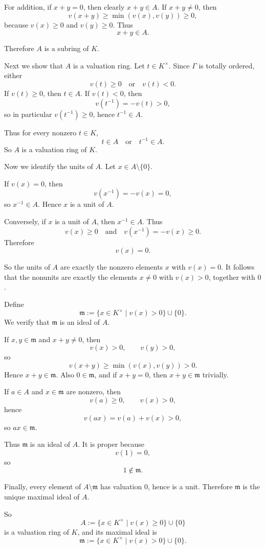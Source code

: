\documentclass[12pt,a4paper,oneside]{report}
\theoremstyle{notespace}
\begin{document}
For addition, if \(x+y=0\), then clearly \(x+y\in A\). If \(x+y\neq 0\), then
\[
v(x+y)\ge \min(v(x),v(y))\ge 0,
\]
because \(v(x)\ge 0\) and \(v(y)\ge 0\). Thus
\[
x+y\in A.
\]

Therefore \(A\) is a subring of \(K\).

\medskip

Next we show that \(A\) is a valuation ring. Let \(t\in K^\times\). Since \(\Gamma\) is totally ordered, either
\[
v(t)\ge 0
\quad\text{or}\quad
v(t)<0.
\]
If \(v(t)\ge 0\), then \(t\in A\). If \(v(t)<0\), then
\[
v(t^{-1})=-v(t)>0,
\]
so in particular \(v(t^{-1})\ge 0\), hence \(t^{-1}\in A\).

Thus for every nonzero \(t\in K\),
\[
t\in A \quad\text{or}\quad t^{-1}\in A.
\]
So \(A\) is a valuation ring of \(K\).

\medskip

Now we identify the units of \(A\). Let \(x\in A\setminus\{0\}\).

If \(v(x)=0\), then
\[
v(x^{-1})=-v(x)=0,
\]
so \(x^{-1}\in A\). Hence \(x\) is a unit of \(A\).

Conversely, if \(x\) is a unit of \(A\), then \(x^{-1}\in A\). Thus
\[
v(x)\ge 0
\quad\text{and}\quad
v(x^{-1})=-v(x)\ge 0.
\]
Therefore
\[
v(x)=0.
\]

So the units of \(A\) are exactly the nonzero elements \(x\) with \(v(x)=0\). It follows that the nonunits are exactly the elements \(x\neq 0\) with \(v(x)>0\), together with \(0\).

Define
\[
\mathfrak m:=\{x\in K^\times\mid v(x)>0\}\cup\{0\}.
\]
We verify that \(\mathfrak m\) is an ideal of \(A\).

If \(x,y\in \mathfrak m\) and \(x+y\neq 0\), then
\[
v(x)>0,\qquad v(y)>0,
\]
so
\[
v(x+y)\ge \min(v(x),v(y))>0.
\]
Hence \(x+y\in \mathfrak m\). Also \(0\in \mathfrak m\), and if \(x+y=0\), then \(x+y\in \mathfrak m\) trivially.

If \(a\in A\) and \(x\in \mathfrak m\) are nonzero, then
\[
v(a)\ge 0,\qquad v(x)>0,
\]
hence
\[
v(ax)=v(a)+v(x)>0,
\]
so \(ax\in \mathfrak m\).

Thus \(\mathfrak m\) is an ideal of \(A\). It is proper because
\[
v(1)=0,
\]
so
\[
1\notin \mathfrak m.
\]

Finally, every element of \(A\setminus \mathfrak m\) has valuation \(0\), hence is a unit. Therefore \(\mathfrak m\) is the unique maximal ideal of \(A\).

So
\[
A:=\{x\in K^\times\mid v(x)\ge 0\}\cup\{0\}
\]
is a valuation ring of \(K\), and its maximal ideal is
\[
\mathfrak m:=\{x\in K^\times\mid v(x)>0\}\cup\{0\}.
\]
	
\end{document}
